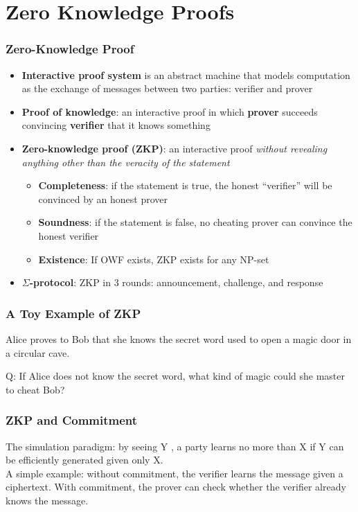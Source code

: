 \section{Zero Knowledge Proofs}
\begin{frame}\frametitle{Zero-Knowledge Proof}
\begin{itemize}
\item \textbf{Interactive proof system} is an abstract machine that models computation as the exchange of messages between two parties: verifier and prover
\item \textbf{Proof of knowledge}: an interactive proof in which \textbf{prover} succeeds convincing \textbf{verifier} that it knows something
\item \textbf{Zero-knowledge proof (ZKP)}: an interactive proof \emph{without revealing anything other than the veracity of the statement}
\begin{itemize}
\item \textbf{Completeness}: if the statement is true, the honest ``verifier'' will be convinced by an honest prover
\item \textbf{Soundness}: if the statement is false, no cheating prover can convince the honest verifier
\item \textbf{Existence}: If OWF exists, ZKP exists for any NP-set
\end{itemize}
\item \textbf{$\Sigma$-protocol}: ZKP in 3 rounds: announcement, challenge, and response
\end{itemize}
\end{frame}
\begin{frame}\frametitle{A Toy Example of ZKP}
Alice {\color{red} \LARGE \Ladiesroom} proves to Bob {\color{blue} \LARGE \Gentsroom} that she knows the secret word used to open a magic door in a circular cave.
\begin{figure}
\begin{center}

\end{center}
\end{figure}
\alert{Q: If Alice does not know the secret word, what kind of magic could she master to cheat Bob?}
\end{frame}
\begin{frame}\frametitle{ZKP and Commitment}
The simulation paradigm: by seeing Y , a party learns no more than X if Y can be efficiently generated given only X.\\
A simple example: without commitment, the verifier learns the message given a ciphertext. With commitment, the prover can check whether the verifier already knows the message.
\begin{figure}
\begin{center}

\end{center}
\end{figure}
\end{frame}
